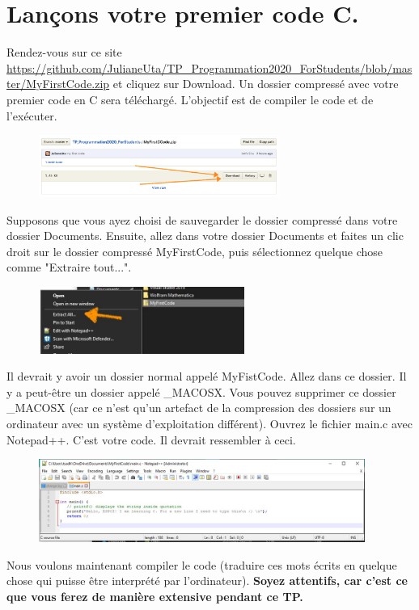 \documentclass{article}
\begin{document}
\section{Lançons votre premier code C.}
Rendez-vous sur ce site \href{https://github.com/JulianeUta/TP_Programmation2020_ForStudents/blob/master/MyFirstCode.zip}{https://github.com/JulianeUta/TP\_Programmation2020\_ForStudents/blob/master/MyFirstCode.zip} et cliquez sur Download. Un dossier compressé avec votre premier code en C sera téléchargé. L'objectif est de compiler le code et de l'exécuter.
\begin{figure}[H]
\center
\includegraphics[width=0.7\textwidth]{Plots/FirstCode_1.png}
\end{figure}
Supposons que vous ayez choisi de sauvegarder le dossier compressé dans votre dossier Documents. Ensuite, allez dans votre dossier Documents et faites un clic droit sur le dossier compressé MyFirstCode, puis sélectionnez quelque chose comme "Extraire tout...".
\begin{figure}[H]
\center
\includegraphics[width=0.6\textwidth]{Plots/FirstCode_2.jpg}
\end{figure}
Il devrait y avoir un dossier normal appelé MyFistCode. Allez dans ce dossier. Il y a peut-être un dossier appelé \_MACOSX.  Vous pouvez supprimer ce dossier \_MACOSX (car ce n'est qu'un artefact de la compression des dossiers sur un ordinateur avec un système d'exploitation différent). Ouvrez le fichier main.c avec Notepad++. C'est votre code. Il devrait ressembler à ceci. 
\begin{figure}[H]
\center
\includegraphics[width=0.95\textwidth]{Plots/FirstCode_9.jpeg}
\end{figure}
Nous voulons maintenant compiler le code (traduire ces mots écrits en quelque chose qui puisse être interprété par l'ordinateur). {\color{Bittersweet}\textbf{Soyez attentifs, car c'est ce que vous ferez de manière extensive pendant ce TP.}}
\end{document}
